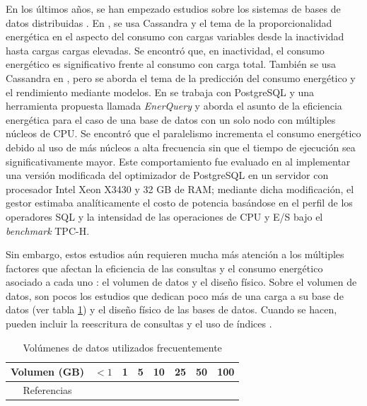 \documentclass[12pt, letter paper]{report}
\begin{document}
      En los últimos años, se han empezado estudios sobre los sistemas de bases
      de datos distribuidas \cite{foschinisql2023, gomesnosql-based2023,
      guoenergy2024}. En \cite{subramaniamenergy2015}, se usa Cassandra y el
      tema de la proporcionalidad energética en el aspecto del consumo con
      cargas variables desde la inactividad hasta cargas
      cargas elevadas. Se encontró que, en inactividad, el consumo energético es
      significativo frente al consumo con carga total. También se usa Cassandra
      en \cite{niemanntowards2016}, pero se aborda el tema de la predicción del
      consumo energético y el rendimiento mediante modelos. En
      \cite{roukhenergy-aware2016} se trabaja con PostgreSQL y una herramienta
      propuesta llamada \textit{EnerQuery} y aborda el asunto de la eficiencia
      energética para el caso de una base de datos con un solo nodo con
      múltiples núcleos de CPU. Se encontró que el paralelismo incrementa el
      consumo energético debido al uso de más núcleos a alta frecuencia sin que
      el tiempo de ejecución sea significativamente mayor. Este comportamiento
      fue evaluado en \cite{roukhenergy-aware2016} al implementar una versión
      modificada del optimizador de PostgreSQL en un servidor  con procesador
      Intel Xeon X3430 y 32 GB de RAM; mediante dicha modificación, el gestor
      estimaba analíticamente el costo de potencia basándose en el perfil de los
      operadores SQL y la intensidad de las operaciones de CPU y E/S bajo el
      \textit{benchmark} TPC-H.

      Sin embargo, estos estudios aún requieren mucha más atención a los
      múltiples factores que afectan la eficiencia de las consultas y el consumo
      energético asociado a cada uno \cite{bunseenergy2014}: el volumen de datos
      y el diseño físico. Sobre el volumen de datos, son pocos los estudios que
      dedican poco más de una carga a su base de datos (ver tabla
      \ref{tab:cargas}) y el diseño físico de las bases de datos. Cuando se
      hacen, pueden incluir la reescritura de consultas
      \cite{langrethinking2011, pisharathreducing2004} y el uso de índices
      \cite{duarteevaluating2018, mahajanenergy2017, mahajanimproving2019}.

      \begin{table}[H]
        \centering
        \caption{Volúmenes de datos utilizados frecuentemente}
        \begin{tabular}{| c | c | c | c | c | c | c | c |}
        \hline Volumen (GB) & $<1$ & 1 & 5 & 10 & 25 & 50 & 100 \\ \hline
        Referencias & \cite{pisharathreducing2004, xuexploring2010,
          duarteevaluating2018} & \cite{xuexploring2010, niemanndoes2013} &
          \cite{xuexploring2010, niemanndoes2013} & \cite{xuexploring2010,
          niemanndoes2013, tranenergy2025} & \cite{tranenergy2025} &
          \cite{tranenergy2025}&\cite{mahajanenergy2017, mahajanimproving2019}
                                                                    \\ \hline
        \end{tabular}
        \label{tab:cargas}
      \end{table}
\end{document}
